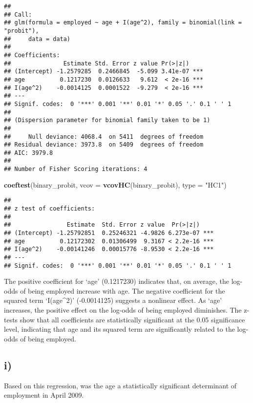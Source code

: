 \documentclass[
]{article}
\newenvironment{Shaded}{\begin{snugshade}}{\end{snugshade}}
\newcommand{\AttributeTok}[1]{\textcolor[rgb]{0.13,0.29,0.53}{#1}}
\newcommand{\FunctionTok}[1]{\textcolor[rgb]{0.13,0.29,0.53}{\textbf{#1}}}
\newcommand{\NormalTok}[1]{#1}
\newcommand{\StringTok}[1]{\textcolor[rgb]{0.31,0.60,0.02}{#1}}
\begin{document}
\begin{verbatim}
## 
## Call:
## glm(formula = employed ~ age + I(age^2), family = binomial(link = "probit"), 
##     data = data)
## 
## Coefficients:
##               Estimate Std. Error z value Pr(>|z|)    
## (Intercept) -1.2579285  0.2466845  -5.099 3.41e-07 ***
## age          0.1217230  0.0126633   9.612  < 2e-16 ***
## I(age^2)    -0.0014125  0.0001522  -9.279  < 2e-16 ***
## ---
## Signif. codes:  0 '***' 0.001 '**' 0.01 '*' 0.05 '.' 0.1 ' ' 1
## 
## (Dispersion parameter for binomial family taken to be 1)
## 
##     Null deviance: 4068.4  on 5411  degrees of freedom
## Residual deviance: 3973.8  on 5409  degrees of freedom
## AIC: 3979.8
## 
## Number of Fisher Scoring iterations: 4
\end{verbatim}

\begin{Shaded}
\begin{Highlighting}[]
\FunctionTok{coeftest}\NormalTok{(binary\_probit, }\AttributeTok{vcov =} \FunctionTok{vcovHC}\NormalTok{(binary\_probit), }\AttributeTok{type =} \StringTok{"HC1"}\NormalTok{)}
\end{Highlighting}
\end{Shaded}

\begin{verbatim}
## 
## z test of coefficients:
## 
##                Estimate  Std. Error z value  Pr(>|z|)    
## (Intercept) -1.25792851  0.25246321 -4.9826 6.273e-07 ***
## age          0.12172302  0.01306499  9.3167 < 2.2e-16 ***
## I(age^2)    -0.00141246  0.00015776 -8.9530 < 2.2e-16 ***
## ---
## Signif. codes:  0 '***' 0.001 '**' 0.01 '*' 0.05 '.' 0.1 ' ' 1
\end{verbatim}

The positive coefficient for `age' (0.1217230) indicates that, on
average, the log-odds of being employed increase with age. The negative
coefficient for the squared term `I(age\^{}2)' (-0.0014125) suggests a
nonlinear effect. As `age' increases, the positive effect on the
log-odds of being employed diminishes. The z-tests show that all
coefficients are statistically significant at the 0.05 significance
level, indicating that age and its squared term are significantly
related to the log-odds of being employed.

\hypertarget{i-1}{%
\subsection{i)}\label{i-1}}

Based on this regression, was the age a statistically significant
determinant of employment in April 2009. \vspace{1em}
\end{document}
